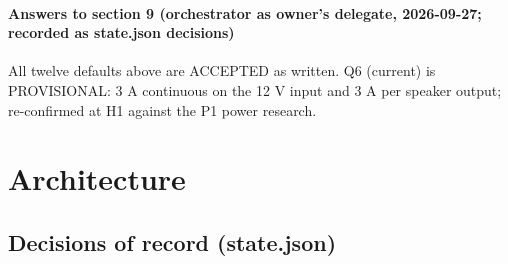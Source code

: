 \documentclass[11pt,a4paper]{article}
\begin{document}
\paragraph*{Answers to section 9 (orchestrator as owner's delegate, 2026-09-27; recorded as state.json decisions)}
All twelve defaults above are ACCEPTED as written. Q6 (current) is PROVISIONAL: 3 A continuous on the 12 V input and 3 A per speaker output; re-confirmed at H1 against the P1 power research.

\section{Architecture}
\subsection*{Decisions of record (state.json)}
\end{document}
